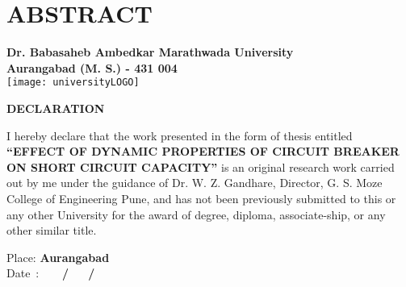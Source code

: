 \clearpage
\chapter*{ABSTRACT}

\clearpage

\begin{center}
\large \textbf{Dr. Babasaheb Ambedkar Marathwada University\\
Aurangabad (M. S.) - 431 004}\\
\vspace{0.5cm}
\texttt{[image: universityLOGO]}\\
\vspace{0.5cm}

\textbf{\large DECLARATION}\\
\end{center}

\normalsize I hereby declare that the work presented in the form of thesis entitled \textbf{\textquotedblleft EFFECT OF DYNAMIC PROPERTIES OF CIRCUIT BREAKER ON SHORT CIRCUIT CAPACITY\textquotedblright} is an original research work carried out by me under the guidance of Dr. W. Z. Gandhare, Director, G. S. Moze College of Engineering Pune, and has not been previously submitted to this or any other University for the award of degree, diploma, associate-ship, or any other similar title.

\vspace{0.5cm}
Place: \textbf{Aurangabad}\\
Date~: \textbf{~~~/~~~/}\\

